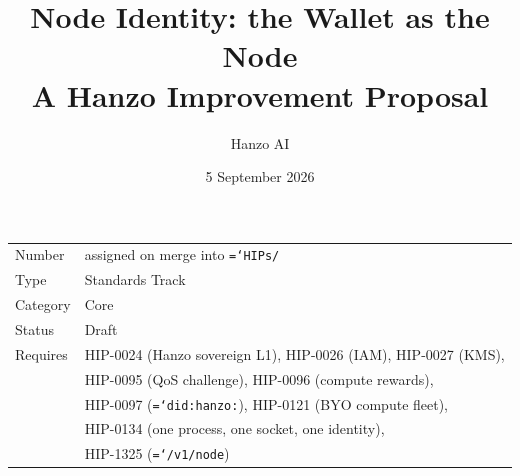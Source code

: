 \documentclass[11pt,a4paper]{article}
\title{\textbf{Node Identity: the Wallet as the Node}\\[6pt]
\large A Hanzo Improvement Proposal}
\author{Hanzo AI}
\date{5 September 2026}
\newcommand{\code}[1]{\texttt{\hyphenchar\font=`\-\relax #1}}
\begin{document}
\maketitle

\begin{center}
\begin{tabular}{@{}ll@{}}
\toprule
Number      & assigned on merge into \code{HIPs/} \\
Type        & Standards Track \\
Category    & Core \\
Status      & Draft \\
Requires    & HIP-0024 (Hanzo sovereign L1), HIP-0026 (IAM), HIP-0027 (KMS),\\
            & HIP-0095 (QoS challenge), HIP-0096 (compute rewards),\\
            & HIP-0097 (\code{did:hanzo:}), HIP-0121 (BYO compute fleet),\\
            & HIP-0134 (one process, one socket, one identity),\\
            & HIP-1325 (\code{/v1/node}) \\
\bottomrule
\end{tabular}
\end{center}
\end{document}
